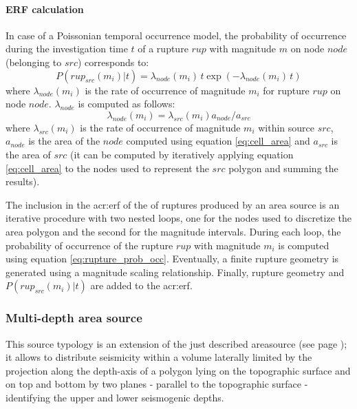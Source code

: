 \paragraph{ERF calculation}
\label{par:erf_calc_area_src}
In case of a Poissonian temporal occurrence model, the probability of 
occurrence during the investigation time $t$ of a rupture $rup$ with 
magnitude $m$ on node $node$ (belonging to $src$) corresponds to:
\begin{equation}
P(rup_{src}(m_i)|t)=\lambda_{node}(m_i)\,t\exp(-\lambda_{node}(m_i)\,t)
\label{eq:rupture_prob_occ}
\end{equation}
where $\lambda_{node}(m_i)$ is the rate of occurrence of magnitude $m_i$ 
for rupture $rup$ on node $node$. $\lambda_{node}$ is computed as follows:
\[ 
\lambda_{node}(m_i) = \lambda_{src}(m_i)a_{node}/a_{src}
\]
%
where $\lambda_{src}(m_i)$ is the rate of occurrence of magnitude $m_i$
within source $src$, $a_{node}$ is the area of the $node$ computed using
equation \ref{eq:cell_area} and $a_{src}$ is the area of $src$ (it can be
computed by iteratively applying equation \ref{eq:cell_area} to the 
nodes used to represent the $src$ polygon and summing the results). 

The inclusion in the \gls{acr:erf} of the of ruptures produced by 
an area source is an iterative procedure with two nested loops, one 
for the nodes used to discretize the area polygon and the second for 
the magnitude intervals. 
%
During each loop, the probability of occurrence of the rupture $rup$
with magnitude $m_i$ is computed using equation \ref{eq:rupture_prob_occ}.
Eventually, a finite rupture geometry is generated using a magnitude 
scaling relationship. Finally, rupture geometry and $P(rup_{src}(m_i)|t)$
are added to the \gls{acr:erf}.
%
\subsubsection{Multi-depth area source}
%
%
%
This source typology is an extension of the just described 
\gls{areasource} (see page \pageref{sec:areasource});
it allows to distribute seismicity within a volume laterally 
limited by the projection along the depth-axis of a polygon 
lying on the topographic surface and on top and bottom by 
two planes - parallel to the topographic surface - identifying the 
upper and lower seismogenic depths.

